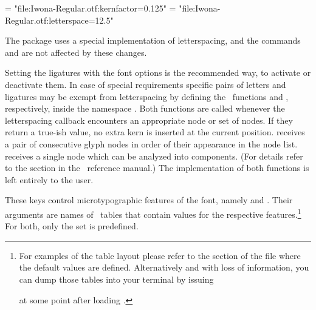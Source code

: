          \beginlisting
    \font \iwonakernedA = "file:Iwona-Regular.otf:kernfactor=0.125"
    \font \iwonakernedB = "file:Iwona-Regular.otf:letterspace=12.5"
         \endlisting

         The  package uses a special implementation of letterspacing, and the commands \inlinecode{\lsstyle} and \inlinecode{\textls} are  not affected by these changes.

         Setting the ligatures with the font options is the recommended way, to activate or deactivate them. In case of special requirements
         specific pairs of letters and ligatures may be exempt from
         letterspacing by defining the \Lua\ functions
          and ,
         respectively, inside the namespace .
         Both functions are called whenever the letterspacing callback
         encounters an appropriate node or set of nodes.
         If they return a true-ish value, no extra kern is inserted at
         the current position.
          receives a pair of consecutive
         glyph nodes in order of their appearance in the node list.
          receives a single node which can be
         analyzed into components.
         (For details refer to the  section in the
         \LuaTeX\ reference manual.)
         The implementation of both functions is left entirely to the
         user.
  \endaltitem

\iffalse
  \startbuffer [printvectors]
  \directlua{inspect(fonts.protrusions.setups.default)
             inspect(fonts.expansions.setups.default)}
  \stopbuffer
\fi

         These keys control microtypographic features of the font,
         namely  and .
         Their arguments are names of \Lua\ tables that contain
         values for the respective features.\footnote{%
            For examples of the table layout please refer to the
            section of the file  where the
            default values are defined.
            Alternatively and with loss of information, you can dump
            those tables into your terminal by issuing
            \unless \iffalse
              \beginlisting
 \directlua{inspect(fonts.protrusions.setups.default)
            inspect(fonts.expansions.setups.default)}
              \endlisting
            \else
              \typebuffer [printvectors]
            \fi
            at some point after loading .
         }
         For both, only the set  is predefined.

